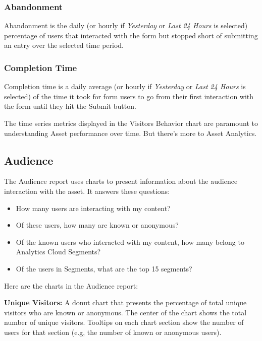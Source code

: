 \subsubsection{Abandonment}\label{abandonment}

Abandonment is the daily (or hourly if \emph{Yesterday} or \emph{Last 24
Hours} is selected) percentage of users that interacted with the form
but stopped short of submitting an entry over the selected time period.

\subsubsection{Completion Time}\label{completion-time}

Completion time is a daily average (or hourly if \emph{Yesterday} or
\emph{Last 24 Hours} is selected) of the time it took for form users to
go from their first interaction with the form until they hit the Submit
button.

The time series metrics displayed in the Visitors Behavior chart are
paramount to understanding Asset performance over time. But there's more
to Asset Analytics.

\subsection{Audience}\label{audience-1}

The Audience report uses charts to present information about the
audience interaction with the asset. It answers these questions:

\begin{itemize}
\tightlist
\item
  How many users are interacting with my content?
\item
  Of these users, how many are known or anonymous?
\item
  Of the known users who interacted with my content, how many belong to
  Analytics Cloud Segments?
\item
  Of the users in Segments, what are the top 15 segments?
\end{itemize}

Here are the charts in the Audience report:

\textbf{Unique Visitors:} A donut chart that presents the percentage of
total unique visitors who are known or anonymous. The center of the
chart shows the total number of unique visitors. Tooltips on each chart
section show the number of users for that section (e.g, the number of
known or anonymous users).

